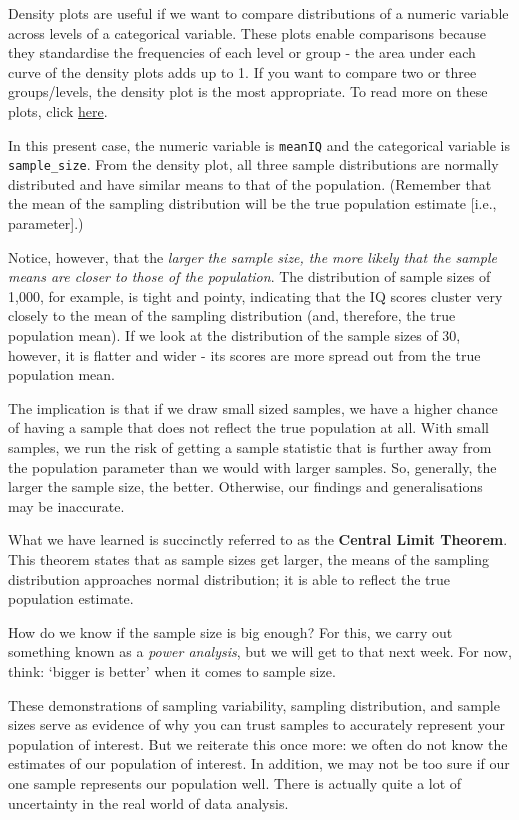 \documentclass[
]{book}
\begin{document}
Density plots are useful if we want to compare distributions of a numeric variable across levels of a categorical variable. These plots enable comparisons because they standardise the frequencies of each level or group - the area under each curve of the density plots adds up to 1. If you want to compare two or three groups/levels, the density plot is the most appropriate. To read more on these plots, click \href{https://clauswilke.com/dataviz/histograms-density-plots.html}{here}.

In this present case, the numeric variable is \texttt{meanIQ} and the categorical variable is \texttt{sample\_size}. From the density plot, all three sample distributions are normally distributed and have similar means to that of the population. (Remember that the mean of the sampling distribution will be the true population estimate {[}i.e., parameter{]}.)

Notice, however, that the \emph{larger the sample size, the more likely that the sample means are closer to those of the population}. The distribution of sample sizes of 1,000, for example, is tight and pointy, indicating that the IQ scores cluster very closely to the mean of the sampling distribution (and, therefore, the true population mean). If we look at the distribution of the sample sizes of 30, however, it is flatter and wider - its scores are more spread out from the true population mean.

The implication is that if we draw small sized samples, we have a higher chance of having a sample that does not reflect the true population at all. With small samples, we run the risk of getting a sample statistic that is further away from the population parameter than we would with larger samples. So, generally, the larger the sample size, the better. Otherwise, our findings and generalisations may be inaccurate.

What we have learned is succinctly referred to as the \textbf{Central Limit Theorem}. This theorem states that as sample sizes get larger, the means of the sampling distribution approaches normal distribution; it is able to reflect the true population estimate.

How do we know if the sample size is big enough? For this, we carry out something known as a \emph{power analysis}, but we will get to that next week. For now, think: `bigger is better' when it comes to sample size.

These demonstrations of sampling variability, sampling distribution, and sample sizes serve as evidence of why you can trust samples to accurately represent your population of interest. But we reiterate this once more: we often do not know the estimates of our population of interest. In addition, we may not be too sure if our one sample represents our population well. There is actually quite a lot of uncertainty in the real world of data analysis.
\end{document}
